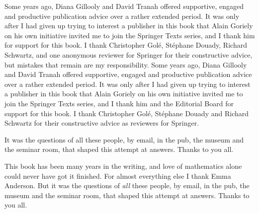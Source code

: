 Some years ago,  Diana Gillooly and David Tranah offered supportive, engaged and productive publication advice over a rather extended period. It was only after I had given up trying to interest a publisher in this book that Alain Goriely on his own initiative invited me to join the Springer Texts series, and I thank him for support for this book. I thank Christopher Golé, Stéphane Douady, Richard Schwartz, and one anonymous reviewer for Springer for their constructive advice, but mistakes that remain are my responsibility. 
Some years ago,  Diana Gillooly and David Tranah offered supportive, engaged and productive publication advice over a rather extended period. It was only after I had given up trying to interest a publisher in this book that Alain Goriely on his own initiative invited me to join the Springer Texts series, and I thank him and the Editorial Board for support for this book. I thank Christopher Golé, Stéphane Douady and Richard Schwartz for their constructive advice as reviewers for Springer. 

It was the questions of all these people, by email, in the pub, the museum and the seminar room, that shaped this attempt at answers.  Thanks to you all. 

This book has been many years in the writing, and love of mathematics alone could never have got it finished. For almost everything else I thank Emma Anderson. But it was the questions of \textit{all} these people, by email, in the pub, the museum and the seminar room, that shaped this attempt at answers.  Thanks to you all. 



